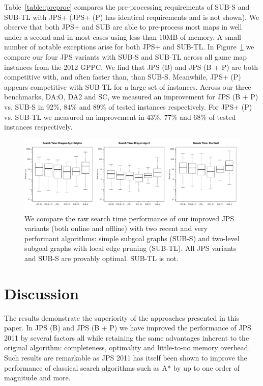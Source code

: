 Table~\ref{table::preproc} compares the pre-processing requirements of 
SUB-S and SUB-TL with JPS+ (JPS+ (P) has identical requirements and is not shown). 
We observe that both JPS+ and SUB are able to pre-process most maps in well under a second 
and in most cases using less than 10MB of memory. A small number of notable exceptions 
arise for both JPS+ and SUB-TL.
In Figure~\ref{fig::vs_sub} we compare our four JPS variants with SUB-S and SUB-TL across all
game map instances from the 2012 GPPC. We find that JPS (B) and JPS (B + P) are both
competitive with, and often faster than, than SUB-S. Meanwhile, JPS+ (P) appears competitive 
with SUB-TL for a large set of instances.
Across our three benchmarks, DA:O, DA2 and SC, we measured an improvement for 
JPS (B + P) vs. SUB-S in 92\%, 84\% and 89\% of tested instances respectively.
For JPS+ (P) vs. SUB-TL we measured an improvement in 43\%, 77\% and 68\% of 
tested instances respectively.

\begin{figure}[tb] 
\begin{center}
		   \includegraphics[width=2.15\columnwidth, trim = 0mm 0mm 0mm 0mm]
			{diagrams/jps_vs_sub_boxplot.pdf}
       \end{center}
		\vspace{-1em}
	   \caption{\small We compare the raw search time performance of our improved JPS variants (both online
		   and offline) with two recent and very performant algorithms: simple subgoal graphs (SUB-S) 
		   and two-level subgoal graphs with local edge pruning (SUB-TL). All JPS variants and SUB-S 
		   are provably optimal. SUB-TL is not.}
\label{fig::vs_sub}
\end{figure}

\section{Discussion}
The results demonstrate the superiority of the approaches presented in this
paper. In JPS (B) and JPS (B + P) we have improved the performance of
JPS 2011 by several factors all while retaining
the same advantages inherent to the original algorithm: completeness, 
optimality and little-to-no memory overhead. Such results are remarkable as
JPS 2011 has itself been shown to improve the performance of classical
search algorithms such as A* by up to one order of magnitude and more.

